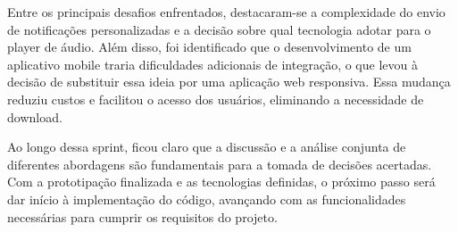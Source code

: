 Entre os principais desafios enfrentados, destacaram-se a complexidade do envio de notificações personalizadas e a decisão sobre qual tecnologia adotar para o player de áudio. Além disso, foi identificado que o desenvolvimento de um aplicativo mobile traria dificuldades adicionais de integração, o que levou à decisão de substituir essa ideia por uma aplicação web responsiva. Essa mudança reduziu custos e facilitou o acesso dos usuários, eliminando a necessidade de download.

Ao longo dessa sprint, ficou claro que a discussão e a análise conjunta de diferentes abordagens são fundamentais para a tomada de decisões acertadas. Com a prototipação finalizada e as tecnologias definidas, o próximo passo será dar início à implementação do código, avançando com as funcionalidades necessárias para cumprir os requisitos do projeto.